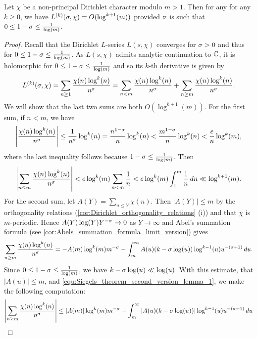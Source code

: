     \begin{lemma}\label{lem:log_growth_of_Dirichlet_L-series_near_1}
      Let $\chi$ be a non-principal Dirichlet character modulo $m > 1$. Then for any for any $k \ge 0$, we have $L^{(k)}(\sigma,\chi) = O(\log^{k+1}(m))$ provided $\sigma$ is such that $0 \le 1-\sigma \le \frac{1}{\log(m)}$.
    \end{lemma}
    \begin{proof}
      Recall that the Dirichlet $L$-series $L(s,\chi)$ converges for $\sigma > 0$ and thus for $0 \le 1-\sigma \le \frac{1}{\log(m)}$. As $L(s,\chi)$ admits analytic continuation to $\mathbb{C}$, it is holomorphic for $0 \le 1-\sigma \le \frac{1}{\log(m)}$ and so its $k$-th derivative is given by
      \[
        L^{(k)}(\sigma,\chi) = \sum_{n \ge 1}\frac{\chi(n)\log^{k}(n)}{n^{\sigma}} = \sum_{n < m}\frac{\chi(n)\log^{k}(n)}{n^{\sigma}}+\sum_{n \ge m}\frac{\chi(n)\log^{k}(n)}{n^{\sigma}}.
      \]
      We will show that the last two sums are both $O(\log^{k+1}(m))$. For the first sum, if $n < m$, we have
      \[
        \left|\frac{\chi(n)\log^{k}(n)}{n^{\sigma}}\right| \le \frac{1}{n^{\sigma}}\log^{k}(n) = \frac{n^{1-\sigma}}{n}\log^{k}(n) < \frac{m^{1-\sigma}}{n}\log^{k}(n) < \frac{e}{n}\log^{k}(m),
      \]
      where the last inequality follows because $1-\sigma \le \frac{1}{\log(m)}$. Then
      \[
        \left|\sum_{n \le m}\frac{\chi(n)\log^{k}(n)}{n^{\sigma}}\right| < e\log^{k}(m)\sum_{n < m}\frac{1}{n} < e\log^{k}(m)\int_{1}^{m}\frac{1}{n}\,dn \ll \log^{k+1}(m).
      \]
      For the second sum, let $A(Y) = \sum_{n \le Y}\chi(n)$. Then $|A(Y)| \le m$ by the orthogonality relations (\cref{cor:Dirichlet_orthogonality_relations} (i)) and that $\chi$ is $m$-periodic. Hence $A(Y)\log(Y)Y^{-\sigma} \to 0$ as $Y \to \infty$ and Abel's summation formula (see \cref{cor:Abels_summation_formula_limit_version}) gives
      \begin{equation}\label{equ:Siegels_theorem_second_version_lemma_1}
        \sum_{n \ge m}\frac{\chi(n)\log^{k}(n)}{n^{\sigma}} = -A(m)\log^{k}(m)m^{-\sigma}-\int_{m}^{\infty}A(u)(k-\sigma\log(u))\log^{k-1}(u)u^{-(\sigma+1)}\,du.
      \end{equation}
      Since $0 \le 1-\sigma \le \frac{1}{\log(m)}$, we have $k-\sigma\log(u) \ll \log(u)$. With this estimate, that $|A(u)| \le m$, and \cref{equ:Siegels_theorem_second_version_lemma_1}, we make the following computation:
      \begin{align*}
        \left|\sum_{n \ge m}\frac{\chi(n)\log^{k}(n)}{n^{\s}}\right| &\le |A(m)|\log^{k}(m)m^{-\s}+\int_{m}^{\infty}|A(u)(k-\s\log(u))|\log^{k-1}(u)u^{-(\s+1)}\,du \\

\end{align*}
\end{proof}
